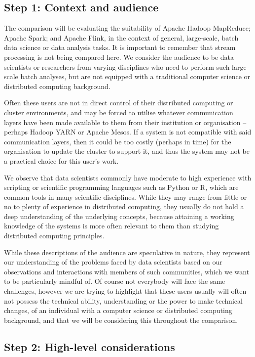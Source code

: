   \subsection{Step 1: Context and audience}
  \label{AUDIENCE}

  The comparison will be evaluating the suitability of Apache Hadoop MapReduce; Apache Spark; and Apache Flink, in the context of general, large-scale, batch data science or data analysis tasks. It is important to remember that stream processing is not being compared here. We consider the audience to be data scientists or researchers from varying disciplines who need to perform such large-scale batch analyses, but are not equipped with a traditional computer science or distributed computing background.
  
  Often these users are not in direct control of their distributed computing or cluster environments, and may be forced to utilise whatever communication layers have been made available to them from their institution or organisation -- perhaps Hadoop YARN or Apache Mesos. If a system is not compatible with said communication layers, then it could be too costly (perhaps in time) for the organisation to update the cluster to support it, and thus the system may not be a practical choice for this user's work.

  We observe that data scientists commonly have moderate to high experience with scripting or scientific programming languages such as Python or R, which are common tools in many scientific disciplines. While they may range from little or no to plenty of experience in distributed computing, they usually do not hold a deep understanding of the underlying concepts, because attaining a working knowledge of the systems is more often relevant to them than studying distributed computing principles.

  While these descriptions of the audience are speculative in nature, they represent our understanding of the problems faced by data scientists based on our observations and interactions with members of such communities, which we want to be particularly mindful of. Of course not everybody will face the same challenges, however we are trying to highlight that these users usually will often not possess the technical ability, understanding or the power to make technical changes, of an individual with a computer science or distributed computing background, and that we will be considering this throughout the comparison.

  \subsection{Step 2: High-level considerations}

